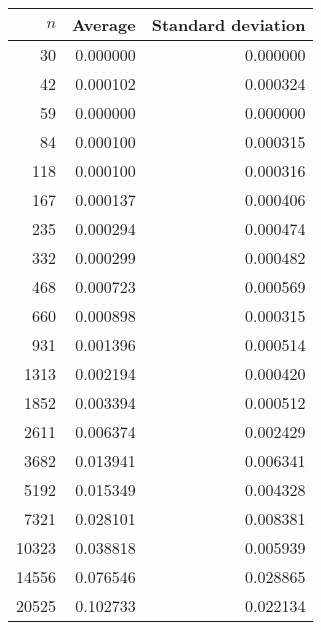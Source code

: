 \begin {tabular}{rrr}
$n$ & Average & Standard deviation\\ \hline 
30 & 0.000000 & 0.000000\\ 
42 & 0.000102 & 0.000324\\ 
59 & 0.000000 & 0.000000\\ 
84 & 0.000100 & 0.000315\\ 
118 & 0.000100 & 0.000316\\ 
167 & 0.000137 & 0.000406\\ 
235 & 0.000294 & 0.000474\\ 
332 & 0.000299 & 0.000482\\ 
468 & 0.000723 & 0.000569\\ 
660 & 0.000898 & 0.000315\\ 
931 & 0.001396 & 0.000514\\ 
1313 & 0.002194 & 0.000420\\ 
1852 & 0.003394 & 0.000512\\ 
2611 & 0.006374 & 0.002429\\ 
3682 & 0.013941 & 0.006341\\ 
5192 & 0.015349 & 0.004328\\ 
7321 & 0.028101 & 0.008381\\ 
10323 & 0.038818 & 0.005939\\ 
14556 & 0.076546 & 0.028865\\ 
20525 & 0.102733 & 0.022134\\ 
\end{tabular}
